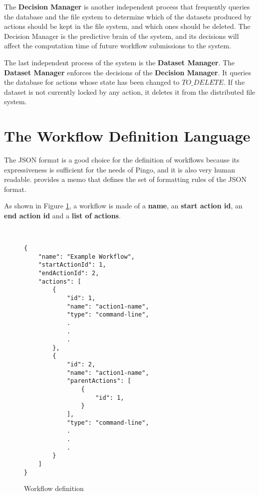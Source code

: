 The \textbf{Decision Manager} is another independent process that frequently queries the database and the file system to determine which of the datasets produced by actions should be kept in the file system, and which ones should be deleted. The Decision Manager is the predictive brain of the system, and its decisions will affect the computation time of future workflow submissions to the system.

The last independent process of the system is the \textbf{Dataset Manager}.  The \textbf{Dataset Manager} enforces the decisions of the \textbf{Decision Manager}.  It queries the database for actions whose state has been changed to $TO\_DELETE$. If the dataset is not currently locked by any action, it deletes it from the distributed file system.

\section{The Workflow Definition Language}
 The JSON format is a good choice for the definition of workflows because its expressiveness is sufficient for the needs of Pingo, and it is also very human readable. \cite{bray2014javascript} provides a memo that defines the set of formatting rules of the JSON format.
 
 As shown in Figure \ref{fig:workflow_definition_language}, a workflow is made of a \textbf{name}, an \textbf{start action id}, an \textbf{end action id} and a \textbf{list of actions}. 

\begin{figure}
\begin{mdframed}
\begin{singlespace}
\begin{verbatim}


{
    "name": "Example Workflow",
    "startActionId": 1,
    "endActionId": 2,
    "actions": [
        {
            "id": 1,
            "name": "action1-name",
            "type": "command-line",
            .
            .
            .
        },
        {
            "id": 2,
            "name": "action1-name",
            "parentActions": [
                { 
                    "id": 1,
                }
            ],
            "type": "command-line",
            .
            .
            .
        }
    ]
}
\end{verbatim}
\end{singlespace}
\end{mdframed}
\caption{Workflow definition}
\label{fig:workflow_definition_language}
\end{figure}

